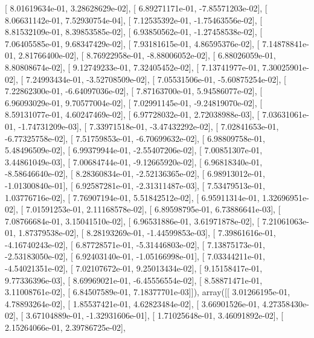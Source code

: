 \documentclass{article}
\begin{document}
       [  8.01619634e-01,   3.28628629e-02],
       [  6.89271171e-01,  -7.85571203e-02],
       [  8.06631142e-01,   7.52930754e-04],
       [  7.12535392e-01,  -1.75463556e-02],
       [  8.81532109e-01,   8.39853585e-02],
       [  6.93850562e-01,  -1.27458538e-02],
       [  7.06405585e-01,   9.68347429e-02],
       [  7.93181615e-01,   4.86595376e-02],
       [  7.14878841e-01,   2.81766400e-02],
       [  8.76922958e-01,  -8.88006052e-02],
       [  6.88026059e-01,   8.80808674e-02],
       [  9.12749233e-01,   7.32405452e-02],
       [  7.13741977e-01,   7.30025901e-02],
       [  7.24993434e-01,  -3.52708509e-02],
       [  7.05531506e-01,  -5.60875254e-02],
       [  7.22862300e-01,  -6.64097036e-02],
       [  7.87163700e-01,   5.94586077e-02],
       [  6.96093029e-01,   9.70577004e-02],
       [  7.02991145e-01,  -9.24819070e-02],
       [  8.59131077e-01,   4.60247469e-02],
       [  6.97728032e-01,   2.72038988e-03],
       [  7.03631061e-01,  -1.74731209e-03],
       [  7.33971518e-01,  -3.47432292e-02],
       [  7.02841653e-01,  -6.77325758e-02],
       [  7.51759853e-01,  -6.70699632e-02],
       [  6.98809758e-01,   5.48496509e-02],
       [  6.99379944e-01,  -2.55407206e-02],
       [  7.00851307e-01,   3.44861049e-03],
       [  7.00684744e-01,  -9.12665920e-02],
       [  6.96818340e-01,  -8.58646640e-02],
       [  8.28360834e-01,  -2.52136365e-02],
       [  6.98913012e-01,  -1.01300840e-01],
       [  6.92587281e-01,  -2.31311487e-03],
       [  7.53479513e-01,   1.03776716e-02],
       [  7.76907194e-01,   5.51842512e-02],
       [  6.95911314e-01,   1.32696951e-02],
       [  7.01591253e-01,   2.11168578e-02],
       [  6.89598795e-01,   6.73886641e-03],
       [  7.08766684e-01,   3.15041510e-02],
       [  6.96531886e-01,   3.61971878e-02],
       [  7.21061063e-01,   1.87379538e-02],
       [  8.28193269e-01,  -1.44599853e-03],
       [  7.39861616e-01,  -4.16740243e-02],
       [  6.87728571e-01,  -5.31446803e-02],
       [  7.13875173e-01,  -2.53183050e-02],
       [  6.92403140e-01,  -1.05166998e-01],
       [  7.03344211e-01,  -4.54021351e-02],
       [  7.02107672e-01,   9.25013434e-02],
       [  9.15158417e-01,   9.77336396e-03],
       [  8.69969021e-01,  -6.45556554e-02],
       [  8.58871471e-01,   3.11008761e-02],
       [  6.84507589e-01,   7.18377701e-03]]), array([[  3.01266195e-01,   4.78893264e-02],
       [  1.85537421e-01,   4.62823484e-02],
       [  3.66901526e-01,   4.27358430e-02],
       [  3.67104889e-01,  -1.32931606e-01],
       [  1.71025648e-01,   3.46091892e-02],
       [  2.15264066e-01,   2.39786725e-02],
\end{document}
